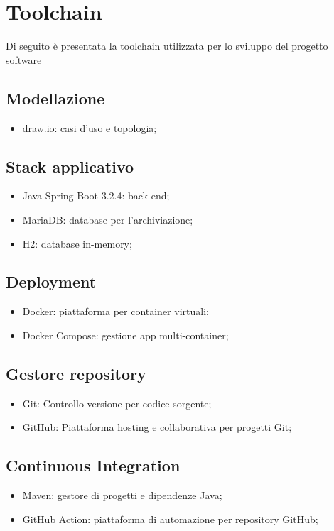 \section{Toolchain}
Di seguito è presentata la toolchain utilizzata per lo sviluppo del progetto software
\subsection{Modellazione}
\begin{itemize}
	\item draw.io: casi d’uso e topologia;
\end{itemize}

\subsection{Stack applicativo}
\begin{itemize}
	\item Java Spring Boot 3.2.4: back-end;
	\item MariaDB: database per l’archiviazione;
	\item H2: database in-memory;
\end{itemize}

\subsection{Deployment}
\begin{itemize}
	\item Docker: piattaforma per container virtuali;
	\item Docker Compose: gestione app multi-container;
\end{itemize}

\subsection{Gestore repository}
\begin{itemize}
	\item Git: Controllo versione per codice sorgente;
	\item GitHub: Piattaforma hosting e collaborativa per progetti Git;
\end{itemize}

\subsection{Continuous Integration}
\begin{itemize}
	\item Maven: gestore di progetti e dipendenze Java;
	\item GitHub Action: piattaforma di automazione per repository GitHub;
\end{itemize}

